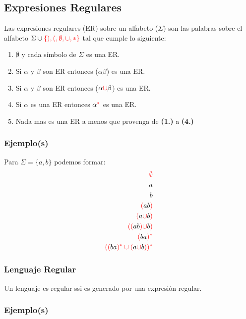 \subsection{Expresiones Regulares}
Las expresiones regulares (ER) sobre un alfabeto ($\Sigma$) son las palabras sobre el alfabeto $\Sigma \cup {\color{red}\{ ), (, \emptyset, \cup,*\}}$ tal que cumple lo siguiente:
\renewcommand{\labelenumi}{\theenumi}
\renewcommand{\theenumi}{\textbf{\arabic {enumi}.)}}%
\begin{enumerate}
\item {\color{red}$\emptyset$} y cada símbolo de $\Sigma$ es una ER.
\item Si $\alpha$ y $\beta$ son ER entonces {\color{red}(}$\alpha\beta${\color{red})} es una ER.
\item Si $\alpha$ y $\beta$ son ER entonces {\color{red}(}$\alpha{\color{red}\cup}\beta${\color{red})} es una ER.
\item Si $\alpha$ es una ER entonces $\alpha^{{\color{red}*}}$ es una ER.
\item Nada mas es una ER a menos que provenga de \textbf{(1.)} a \textbf{(4.)}
\end{enumerate}
\subsubsection*{Ejemplo(s)}
Para $\Sigma = \{ a,b \}$ podemos formar:
\begin{align*}
{{\color{red}\emptyset}}\\
a\\
b\\
{{\color{red}(}}ab{{\color{red})}}\\
{{\color{red}(}}a{\color{red}\cup}b{{\color{red})}}\\
{{\color{red}(}}{\color{red}(}ab{\color{red})}{\color{red}\cup}b{{\color{red})}}\\
{{\color{red}(}}ba{{\color{red})^*}}\\
{\color{red}((}ba{\color{red})^*\cup(}a{\color{red}\cup}b{\color{red}))^*}
\end{align*}
\subsubsection*{Lenguaje Regular}
Un lenguaje es regular ssi es generado por una expresión regular.
\subsubsection*{Ejemplo(s)}
